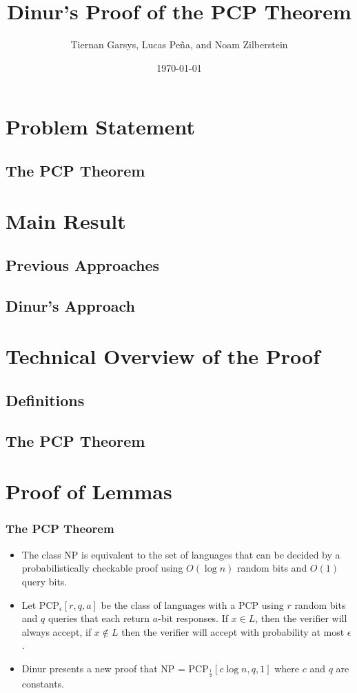 \documentclass{beamer}
\title{Dinur's Proof of the PCP Theorem}
\author{Tiernan Garsys, Lucas Pe\~{n}a, and Noam Zilberstein}
\date{\today}
\begin{document}
\frame{\titlepage}

\section[Outline]{}
\frame{\tableofcontents}

\section{Problem Statement}
\subsection{The PCP Theorem}
\subsection{}
\section{Main Result}
\subsection{Previous Approaches}
\subsection{Dinur's Approach}
\section{Technical Overview of the Proof}
\subsection{Definitions}
\subsection{The PCP Theorem}
\section{Proof of Lemmas}
\frame
{
  \frametitle{The PCP Theorem}

  \begin{itemize}
  \item<1-> The class NP is equivalent to the set of languages that can be decided by a probabilistically checkable proof using $O(\log n)$ random bits and $O(1)$ query bits.
  \item<2-> Let PCP$_{\epsilon}[r, q, a]$ be the class of languages with a PCP using $r$ random bits and $q$ queries that each return $a$-bit responses.  If $x\in L$, then the verifier will always accept, if $x\not\in L$ then the verifier will accept with probability at most $\epsilon$.   
  \item<3-> Dinur presents a new proof that NP = PCP$_\frac12[c\log n, q, 1]$ where $c$ and $q$ are constants. 
  \end{itemize}
}
\end{document}
